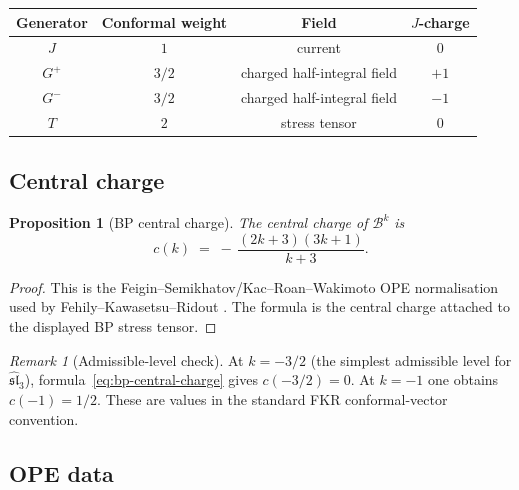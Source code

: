 \documentclass[11pt]{article}
\theoremstyle{plain}
\newtheorem{proposition}[theorem]{Proposition}
\theoremstyle{definition}
\theoremstyle{remark}
\newtheorem{remark}[theorem]{Remark}
\newcommand{\fsl}{\mathfrak{sl}}
\newcommand{\cB}{\mathcal{B}}
\numberwithin{equation}{section}
\begin{document}
\begin{center}
\renewcommand{\arraystretch}{1.3}
\begin{tabular}{cccc}
\toprule
Generator & Conformal weight & Field & $J$-charge \\
\midrule
$J$ & $1$ & current & $0$ \\
$G^+$ & $3/2$ & charged half-integral field & $+1$ \\
$G^-$ & $3/2$ & charged half-integral field & $-1$ \\
$T$ & $2$ & stress tensor & $0$ \\
\bottomrule
\end{tabular}
\end{center}

\subsection{Central charge}

\begin{proposition}[BP central charge]\label{prop:bp-central-charge}
The central charge of $\cB^k$ is
\begin{equation}\label{eq:bp-central-charge}
 c(k)
 \;=\;
 -\,\frac{(2k+3)(3k+1)}{k+3}.
\end{equation}
\end{proposition}

\begin{proof}
This is the Feigin--Semikhatov/Kac--Roan--Wakimoto OPE
normalisation used by Fehily--Kawasetsu--Ridout
\cite{FeiginSemikhatov,KRW03,FKR20}. The formula is the central
charge attached to the displayed BP stress tensor.
\end{proof}

\begin{remark}[Admissible-level check]\label{rem:admissible-check}
At $k = -3/2$ (the simplest admissible level for $\widehat{\fsl}_3$),
formula~\eqref{eq:bp-central-charge} gives $c(-3/2)=0$. At
$k=-1$ one obtains $c(-1)=1/2$. These are values in the standard
FKR conformal-vector convention.
\end{remark}

\subsection{OPE data}
\end{document}
